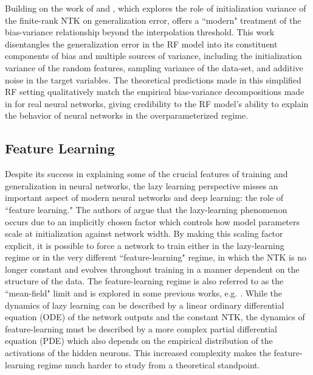\documentclass[a4paper, 11pt]{article}
\begin{document}
Building on the work of \cite{meiGeneralizationErrorRandom2019} and \cite{ geigerScalingDescriptionGeneralization2019}, which explores the role of initialization variance of the finite-rank NTK on generalization error, \cite{dascoliDoubleTroubleDouble2020} offers a ``modern" treatment of the bias-variance relationship beyond the interpolation threshold. This work disentangles the generalization error in the RF model into its constituent components of bias and multiple sources of variance, including the initialization variance of the random features, sampling variance of the data-set, and additive noise in the target variables. The theoretical predictions made in this simplified RF setting qualitatively match the empirical bias-variance decompositions made in \cite{nealModernTakeBiasVariance2019} for real neural networks, giving credibility to the RF model's ability to explain the behavior of neural networks in the overparameterized regime.

\subsection{Feature Learning}

Despite its success in explaining some of the crucial features of training and generalization in neural networks, the lazy learning perspective misses an important aspect of modern neural networks and deep learning: the role of ``feature learning."  The authors of \cite{chizatLazyTrainingDifferentiable2020} argue that the lazy-learning phenomenon occurs due to an implicitly chosen factor which controls how model parameters scale at initialization against network width. By making this scaling factor explicit, it is possible to force a network to train either in the lazy-learning regime or in the very different ``feature-learning" regime, in which the NTK is no longer constant and evolves throughout training in a manner dependent on the structure of the data. The feature-learning regime is also referred to as the ``mean-field" limit and is explored in some previous works, e.g. \cite{meiMeanFieldView2018}. While the dynamics of lazy learning can be described by a linear ordinary differential equation (ODE) of the network outputs and the constant NTK, the dynamics of feature-learning must be described by a more complex partial differential equation (PDE) which also depends on the empirical distribution of the activations of the hidden neurons. This increased complexity makes the feature-learning regime much harder to study from a theoretical standpoint.\\
\end{document}
